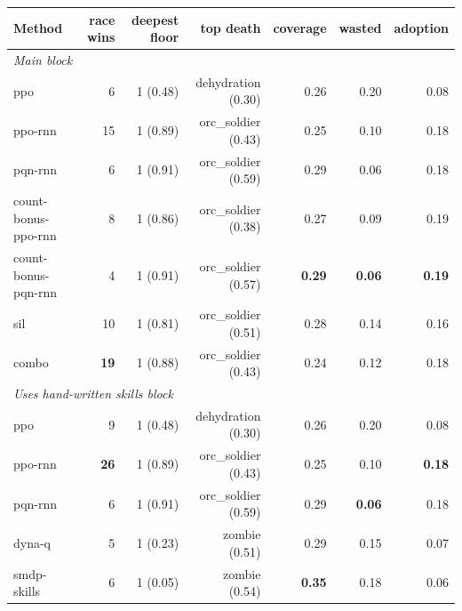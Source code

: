 \begin{tabular}{lrrrrrr}
\toprule
Method & race wins & deepest floor & top death & coverage & wasted & adoption \\
\midrule
\multicolumn{7}{l}{\emph{Main block}} \\
ppo & 6 & 1 (0.48) & dehydration (0.30) & 0.26 & 0.20 & 0.08 \\
ppo-rnn & 15 & 1 (0.89) & orc\_soldier (0.43) & 0.25 & 0.10 & 0.18 \\
pqn-rnn & 6 & 1 (0.91) & orc\_soldier (0.59) & 0.29 & 0.06 & 0.18 \\
count-bonus-ppo-rnn & 8 & 1 (0.86) & orc\_soldier (0.38) & 0.27 & 0.09 & 0.19 \\
count-bonus-pqn-rnn & 4 & 1 (0.91) & orc\_soldier (0.57) & \textbf{0.29} & \textbf{0.06} & \textbf{0.19} \\
sil & 10 & 1 (0.81) & orc\_soldier (0.51) & 0.28 & 0.14 & 0.16 \\
combo & \textbf{19} & 1 (0.88) & orc\_soldier (0.43) & 0.24 & 0.12 & 0.18 \\
\midrule
\multicolumn{7}{l}{\emph{Uses hand-written skills block}} \\
ppo & 9 & 1 (0.48) & dehydration (0.30) & 0.26 & 0.20 & 0.08 \\
ppo-rnn & \textbf{26} & 1 (0.89) & orc\_soldier (0.43) & 0.25 & 0.10 & \textbf{0.18} \\
pqn-rnn & 6 & 1 (0.91) & orc\_soldier (0.59) & 0.29 & \textbf{0.06} & 0.18 \\
dyna-q & 5 & 1 (0.23) & zombie (0.51) & 0.29 & 0.15 & 0.07 \\
smdp-skills & 6 & 1 (0.05) & zombie (0.54) & \textbf{0.35} & 0.18 & 0.06 \\
\bottomrule
\end{tabular}

